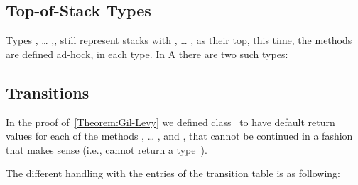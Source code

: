 \subsection{Top-of-Stack Types}
Types , … ,, still represent stacks
  with , … , as their top,
  this time, the methods are defined ad-hock, in each type.
In A there are two such types:

\begin{quote}
\end{quote}

\subsection{Transitions}
In the proof of~\cref{Theorem:Gil-Levy} we defined class~ to have 
  default return values for each of the methods , … , and \cc{\$()},
  that cannot be continued in a fashion that makes sense (i.e., cannot return a type~).
  
The different handling with the entries of the transition table is as following:
\begin{description}
 \item 
\end{description}
